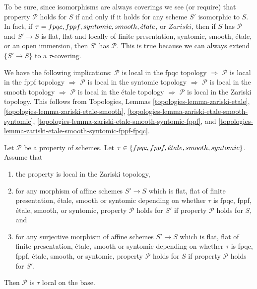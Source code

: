 \noindent
To be sure, since isomorphisms are always coverings
we see (or require) that property $\mathcal{P}$ holds for $S$
if and only if it holds for any scheme $S'$ isomorphic to $S$.
In fact, if $\tau = fpqc,\linebreak[0] fppf,\linebreak[0] syntomic,
\linebreak[0] smooth,\linebreak[0] \acute{e}tale$, or $Zariski$, then
if $S$ has $\mathcal{P}$ and $S' \to S$ is
flat, flat and locally of finite presentation, syntomic, smooth, \'etale, or
an open immersion, then $S'$ has $\mathcal{P}$. This is true because
we can always extend $\{S' \to S\}$ to a $\tau$-covering.

\medskip\noindent
We have the following implications:
$\mathcal{P}$ is local in the fpqc topology
$\Rightarrow$
$\mathcal{P}$ is local in the fppf topology 
$\Rightarrow$
$\mathcal{P}$ is local in the syntomic topology 
$\Rightarrow$
$\mathcal{P}$ is local in the smooth topology 
$\Rightarrow$
$\mathcal{P}$ is local in the \'etale topology
$\Rightarrow$
$\mathcal{P}$ is local in the Zariski topology.
This follows from
Topologies, Lemmas
\ref{topologies-lemma-zariski-etale},
\ref{topologies-lemma-zariski-etale-smooth}, 
\ref{topologies-lemma-zariski-etale-smooth-syntomic},
\ref{topologies-lemma-zariski-etale-smooth-syntomic-fppf}, and
\ref{topologies-lemma-zariski-etale-smooth-syntomic-fppf-fpqc}.

\begin{lemma}
\label{lemma-descending-properties}
Let $\mathcal{P}$ be a property of schemes.
Let $\tau \in \{fpqc,\linebreak[0] fppf,\linebreak[0]
\acute{e}tale,\linebreak[0] smooth,\linebreak[0] syntomic\}$.
Assume that
\begin{enumerate}
\item the property is local in the Zariski topology,
\item for any morphism of affine schemes $S' \to S$
which is flat, flat of finite presentation,
\'etale, smooth or syntomic depending on whether $\tau$ is
fpqc, fppf, \'etale, smooth, or syntomic,
property $\mathcal{P}$ holds for $S'$ if property $\mathcal{P}$
holds for $S$, and
\item for any surjective morphism of affine schemes $S' \to S$
which is flat, flat of finite presentation,
\'etale, smooth or syntomic depending on whether $\tau$ is
fpqc, fppf, \'etale, smooth, or syntomic,
property $\mathcal{P}$ holds for $S$ if property $\mathcal{P}$
holds for $S'$.
\end{enumerate}
Then $\mathcal{P}$ is $\tau$ local on the base.
\end{lemma}

